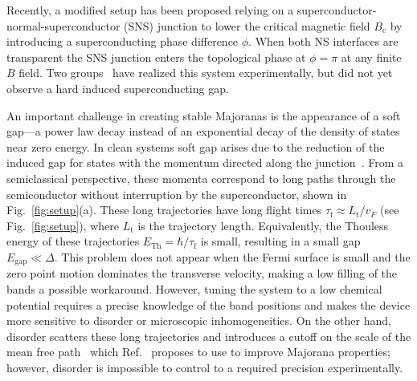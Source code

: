 \documentclass[english, twocolumn, 10pt, aps, superscriptaddress, floatfix, prb, citeautoscript]{revtex4-1}
\renewcommand{\comment}[2]{#2}
\begin{document}
\comment{SNS junctions also work and require smaller field.}
Recently, a modified setup has been proposed\cite{Pientka2017,Hell2017} relying on a superconductor-normal-superconductor (SNS) junction to lower the critical magnetic field $B_\textrm{c}$ by introducing a superconducting phase difference $\phi$.
When both NS interfaces are transparent the SNS junction enters the topological phase at $\phi=\pi$ at any finite $B$ field.
Two groups~\cite{Fornieri2019,Ren2019} have realized this system experimentally, but did not yet observe a hard induced superconducting gap.

\comment{The gap is small because of long trajectories.}
An important challenge in creating stable Majoranas is the appearance of a soft gap---a power law decay instead of an exponential decay of the density of states near zero energy.
In clean systems soft gap arises due to the reduction of the induced gap for states with the momentum directed along the junction~\cite{Gennes1963,Beenakker2005}.
From a semiclassical perspective, these momenta correspond to long paths through the semiconductor without interruption by the superconductor, shown in Fig.~\ref{fig:setup}(a).
These long trajectories have long flight times $\tau_\textrm{f} \approx L_\textrm{t} / v_F$ (see Fig.~\ref{fig:setup}), where $L_\textrm{t}$ is the trajectory length.
Equivalently, the Thouless energy of these trajectories $E_{\textrm{Th}}=\hbar / \tau_\textrm{f}$ is small, resulting in a small gap $E_\textrm{gap} \ll \Delta$.
This problem does not appear when the Fermi surface is small and the zero point motion dominates the transverse velocity, making a low filling of the bands a possible workaround\cite{Beenakker2005,Nijholt2016}.
However, tuning the system to a low chemical potential requires a precise knowledge of the band positions and makes the device more sensitive to disorder or microscopic inhomogeneities.
On the other hand, disorder scatters these long trajectories and introduces a cutoff on the scale of the mean free path~\cite{Golubov1988,Belzig1996,Pilgram2000} which Ref.~ proposes to use to improve Majorana properties; however, disorder is impossible to control to a required precision experimentally.
\end{document}
